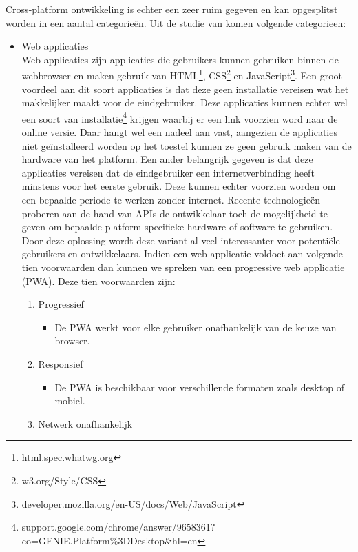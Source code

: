 Cross-platform ontwikkeling is echter een zeer ruim gegeven en kan opgesplitst worden in een aantal categorieën. Uit de studie van \textcite{Xanthopoulos2013} komen volgende categorieen:
\begin{itemize}
    \item Web applicaties\\
    Web applicaties zijn applicaties die gebruikers kunnen gebruiken binnen de webbrowser en maken gebruik van HTML\footnote{html.spec.whatwg.org}, CSS\footnote{w3.org/Style/CSS} en JavaScript\footnote{developer.mozilla.org/en-US/docs/Web/JavaScript}. Een groot voordeel aan dit soort applicaties is dat deze geen installatie vereisen wat het makkelijker maakt voor de eindgebruiker. Deze applicaties kunnen echter wel een soort van installatie\footnote{support.google.com/chrome/answer/9658361?co=GENIE.Platform\%3DDesktop\&hl=en} krijgen waarbij er een link voorzien word naar de online versie. Daar hangt wel een nadeel aan vast, aangezien de applicaties niet geïnstalleerd worden op het toestel kunnen ze geen gebruik maken van de hardware van het platform. Een ander belangrijk gegeven is dat deze applicaties vereisen dat de eindgebruiker een internetverbinding heeft minstens voor het eerste gebruik. Deze kunnen echter voorzien worden om een bepaalde periode te werken zonder internet. Recente technologieën proberen aan de hand van APIs de ontwikkelaar toch de mogelijkheid te geven om bepaalde platform specifieke hardware of software te gebruiken. Door deze oplossing wordt deze variant al veel interessanter voor potentiële gebruikers en ontwikkelaars. Indien een web applicatie voldoet aan volgende tien voorwaarden \autocite{Osmani2015} dan kunnen we spreken van een progressive web applicatie (PWA). Deze tien voorwaarden zijn: 
    \begin{enumerate}
       \item Progressief
       \begin{itemize}
           \item De PWA werkt voor elke gebruiker onafhankelijk van de keuze van browser.
       \end{itemize}
       \item Responsief
       \begin{itemize}
           \item De PWA is beschikbaar voor verschillende formaten zoals desktop of mobiel.
       \end{itemize}
       \item Netwerk onafhankelijk
       \begin{itemize}

\end{itemize}
\end{enumerate}
\end{itemize}
